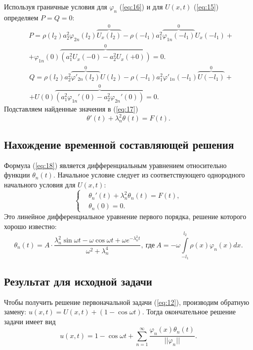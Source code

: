 \documentclass[12pt, a4paper]{article}
\begin{document}
Используя граничные условия для $\varphi_n$ (\ref{eq:16}) и для $U(x,t)$ (\ref{eq:15}) определяем $P=Q=0$:
\begin{equation}
  \begin{aligned}
  & P = \rho(l_2) a_2^2 \varphi_{2n}(l_2) \overbrace{U_x(l_2)}^0 - \rho(-l_1) a_1^2 \overbrace{\varphi_{1n}(-l_1)}^0 U_x(-l_1) + \\
  & + \varphi_{1n}(0)\overbrace{(a_1^2 U_x(-0) - a_2^2 U_x(+0))}^0 = 0.
\end{aligned}
\end{equation}
\begin{equation}
  \begin{aligned}
    & Q = \rho(l_2) a_2^2 \overbrace{\varphi'_{2n}(l_2)}^0 U(l_2) - \rho(-l_1) a_1^2 \varphi'_{1n}(-l_1) \overbrace{U(-l_1)}^0 + \\
    & + U(0)\overbrace{(a_1^2 \varphi_{1n}'(0) - a_2^2 \varphi_{2n}'(0))}^0 = 0.
\end{aligned}
\end{equation}
Подставляем найденные значения в (\ref{eq:17})
\begin{equation}
\theta'(t) + \lambda_n^2 \theta(t) = F(t).
\label{eq:18}
\end{equation}
\subsection{Нахождение временной составляющей решения}
Формула (\ref{eq:18}) является дифференциальным уравнением относительно функции $\theta_n(t)$. Начальное условие следует из соответствующего однородного начального условия для $U(x,t)$:
\begin{equation}
  \left\{  
  \begin{aligned}
    & \theta_n'(t) + \lambda_n^2 \theta_n(t) = F(t), \\
    & \theta_n (0) = 0.
  \end{aligned}
  \right.
\end{equation}
Это линейное дифференциальное уравнение первого порядка, решение которого хорошо известно:
\begin{equation}
  \theta_n(t) = A\cdot\frac{\lambda_n^2 \sin \omega t - \omega \cos \omega t + \omega e^{-\lambda_n^2 t}}{\omega^2 + \lambda_n^4},\ \text{где}\ A=-\omega\int\limits_{-l_1}^{l_2}\rho(x)\varphi_n(x)dx.
\end{equation}
\subsection{Результат для исходной задачи}
Чтобы получить решение первоначальной задачи (\ref{eq:12}), производим обратную замену: $u(x,t) = U(x,t) + (1 - \cos \omega t)$. Тогда окончательное решение задачи имеет вид
\begin{equation}
  u(x,t)= 1 - \cos \omega t + \sum \limits_{n=1}^{\infty} \frac{\varphi_n(x) \theta_n(t)}{||\varphi_n||}.
\end{equation}
\end{document}
